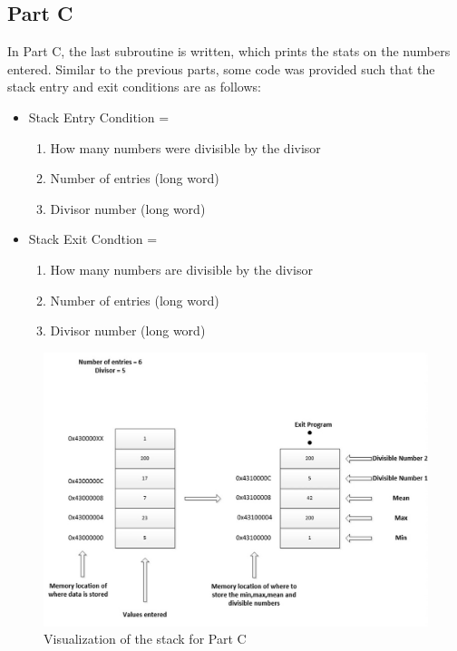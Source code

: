 \documentclass[letterpaper]{article}
\begin{document}
    \subsection{Part C}

    In Part C, the last subroutine is written, which prints the stats
    on the numbers entered. Similar to the previous parts, some code was provided
    such that the stack entry and exit conditions are as follows:

    \begin{itemize}
      \item Stack Entry Condition =
        \begin{enumerate}
          \item How many numbers were divisible by the divisor
          \item Number of entries (long word)
          \item Divisor number (long word)
        \end{enumerate}
      \item Stack Exit Condtion =
        \begin{enumerate}
          \item How many numbers are divisible by the divisor
          \item Number of entries (long word)
          \item Divisor number (long word)
        \end{enumerate}
    \end{itemize}

    \begin{figure}[h!]
      \centering
      \includegraphics[width=.8\textwidth]{designc.jpg}
      \caption{Visualization of the stack for Part C}
    \end{figure}
\end{document}
